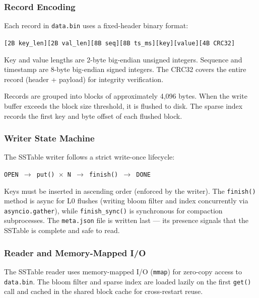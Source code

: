 \documentclass[conference]{IEEEtran}
\begin{document}
\subsubsection{Record Encoding}

Each record in \texttt{data.bin} uses a fixed-header binary format:

\begin{center}
\texttt{[2B key\_len][2B val\_len][8B seq][8B ts\_ms][key][value][4B CRC32]}
\end{center}

Key and value lengths are 2-byte big-endian unsigned integers. Sequence and timestamp are 8-byte big-endian signed integers. The CRC32 covers the entire record (header + payload) for integrity verification.

Records are grouped into blocks of approximately 4,096 bytes. When the write buffer exceeds the block size threshold, it is flushed to disk. The sparse index records the first key and byte offset of each flushed block.

\subsubsection{Writer State Machine}

The SSTable writer follows a strict write-once lifecycle:

\begin{center}
\texttt{OPEN $\rightarrow$ put() $\times$ N $\rightarrow$ finish() $\rightarrow$ DONE}
\end{center}

Keys must be inserted in ascending order (enforced by the writer). The \texttt{finish()} method is async for L0 flushes (writing bloom filter and index concurrently via \texttt{asyncio.gather}), while \texttt{finish\_sync()} is synchronous for compaction subprocesses. The \texttt{meta.json} file is written last --- its presence signals that the SSTable is complete and safe to read.

\subsubsection{Reader and Memory-Mapped I/O}

The SSTable reader uses memory-mapped I/O (\texttt{mmap}) for zero-copy access to \texttt{data.bin}. The bloom filter and sparse index are loaded lazily on the first \texttt{get()} call and cached in the shared block cache for cross-restart reuse.
\end{document}
